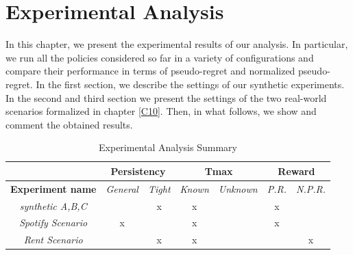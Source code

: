 \chapter{Experimental Analysis}\label{C11}

In this chapter, we present the experimental results of our analysis. In particular, we run all the policies considered so far in a variety of configurations and compare their performance in terms of pseudo-regret and normalized pseudo-regret. In the first section, we describe the settings of our synthetic experiments. In the second and third section we present the settings of the two real-world scenarios formalized in chapter \ref{C10}. Then, in what follows, we show and comment the obtained results.


\begin{table}[h]
	\centering
	\caption{Experimental Analysis Summary}
	\begin{tabular}{|c|c|c|c|c|c|c|} 
		\hhline{~------|}
		\multicolumn{1}{l|}{}     & \multicolumn{2}{c|}{{\cellcolor[rgb]{0.878,0.878,0.878}}\textbf{Persistency}}                              & \multicolumn{2}{c|}{\textbf{Tmax}} & \multicolumn{2}{c|}{{\cellcolor[rgb]{0.878,0.878,0.878}}\textbf{Reward}}                                 \\ 
		\hline
		\textbf{Experiment name}  & {\cellcolor[rgb]{0.878,0.878,0.878}}\textit{General} & {\cellcolor[rgb]{0.878,0.878,0.878}}\textit{Tight} & \textit{Known} & \textit{Unknown}  & {\cellcolor[rgb]{0.878,0.878,0.878}}\textit{P.R.} & {\cellcolor[rgb]{0.878,0.878,0.878}}\textit{N.P.R.}  \\ 
		\hline
		\textit{synthetic A,B,C}      & {\cellcolor[rgb]{0.878,0.878,0.878}}                 & {\cellcolor[rgb]{0.878,0.878,0.878}}x               & x              &                   & {\cellcolor[rgb]{0.878,0.878,0.878}}x             & {\cellcolor[rgb]{0.878,0.878,0.878}}                 \\ 
		\hline
		\textit{Spotify Scenario} & {\cellcolor[rgb]{0.878,0.878,0.878}}x                & {\cellcolor[rgb]{0.878,0.878,0.878}}                & x              &                   & {\cellcolor[rgb]{0.878,0.878,0.878}}x             & {\cellcolor[rgb]{0.878,0.878,0.878}}                 \\ 
		\hline
		\textit{Rent Scenario}    & {\cellcolor[rgb]{0.878,0.878,0.878}}                 & {\cellcolor[rgb]{0.878,0.878,0.878}}x               & x              &                   & {\cellcolor[rgb]{0.878,0.878,0.878}}              & {\cellcolor[rgb]{0.878,0.878,0.878}}x                \\
		\hline
	\end{tabular}

\end{table}

